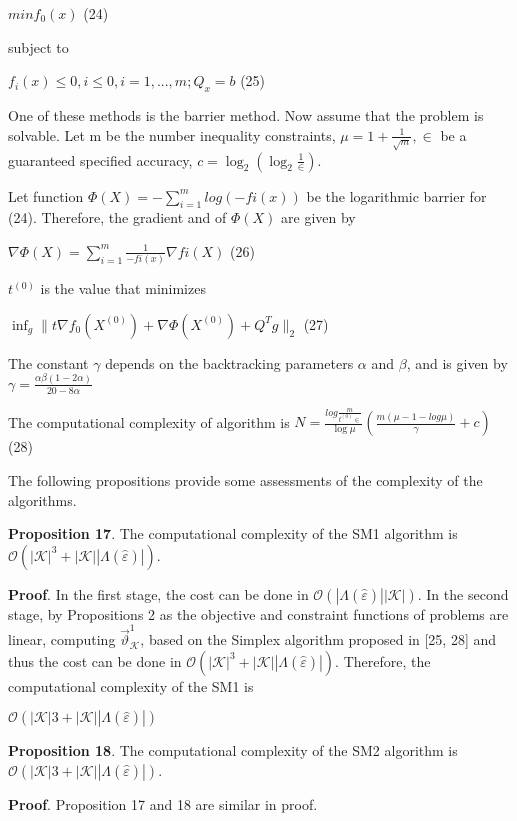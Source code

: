 \documentclass[10pt,a4paper]{IOS-Book-Article}
\begin{document}
$min f_0(x)$ (24)

subject to

$f_i(x) \le 0, i \le 0, i = 1, ...,m;Q_x = b$ (25)

One of these methods is the barrier method. Now assume that the problem is solvable. Let m be the number inequality constraints, $\mu = 1 + \frac{1}{\sqrt{m}}, \in$ be a 
guaranteed specified accuracy, $c = \log_2 (\log_2 \frac{1}{\in})$.

Let function $\Phi(X) = −\sum^m_{i=1} log(−fi(x))$ be the
logarithmic barrier for (24). Therefore, the gradient
and of $\Phi(X)$ are given by

$\nabla \Phi(X) = \sum^m_{i=1} \frac{1}{−fi(x)} \nabla fi(X)$ (26)

$t^{(0)}$ is the value that minimizes

$\inf_g \parallel t\nabla f_0 \left( X^{(0)} \right) + \nabla \Phi \left( X^{(0)} \right) + Q^T g \parallel _2$ (27)

The constant $\gamma$ depends on the backtracking
parameters $\alpha$ and $\beta$, and is given by $\gamma =  \frac{\alpha\beta(1−2\alpha)}{20−8\alpha}$

The computational complexity of algorithm is
$N = \frac{log \frac{m}{t^{(0)} \in}}{ \log\mu }
\left( \frac{m(\mu − 1 − log\mu)}{\gamma} + c \right)$ (28)

The following propositions provide some assessments of the complexity of the algorithms.

\textbf{Proposition 17}. The computational complexity of the
SM1 algorithm is $\mathcal{O}(|\mathcal{K}|^3 + |\mathcal{K}| |\Lambda(\hat{\varepsilon} )|)$.

\textbf{Proof}. In the first stage, the cost can be done in
$\mathcal{O}(|\Lambda(\hat{\varepsilon})| |\mathcal{K}|)$. In the second stage, by Propositions
2 as the objective and constraint functions of problems
are linear, computing $\vec{\vartheta}^1_\mathcal{K}$, based on the Simplex
algorithm proposed in [25, 28] and thus the cost can
be done in $\mathcal{O}(|\mathcal{K}|^3 + |\mathcal{K}| |\Lambda(\hat{\varepsilon})|)$. Therefore, the computational
complexity of the SM1 is

$\mathcal{O}(|\mathcal{K}|3 + |\mathcal{K}| |\Lambda(\hat{\varepsilon})|)$

\textbf{Proposition 18}. The computational complexity of the
SM2 algorithm is $\mathcal{O}(|\mathcal{K}|3 + |\mathcal{K}| |\Lambda(\hat{\varepsilon})|)$.

\textbf{Proof}. Proposition 17 and 18 are similar in proof.
\end{document}
